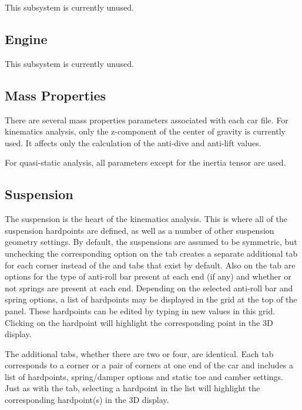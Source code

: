 This subsystem is currently unused.

\subsection{Engine} \label{ssec:engine}

This subsystem is currently unused.

\subsection{Mass Properties} \label{ssec:massProperties}

There are several mass properties parameters associated with each car file.  For kinematics analysis, only the z-component of the center of gravity is currently used.  It affects only the calculation of the anti-dive and anti-lift values.

For quasi-static analysis, all parameters except for the inertia tensor are used.

\subsection{Suspension} \label{ssec:suspension}

The suspension is the heart of the kinematics analysis.  This is where all of the suspension hardpoints are defined, as well as a number of other suspension geometry settings.  By default, the suspensions are assumed to be symmetric, but unchecking the corresponding option on the  tab creates a separate additional tab for each corner instead of the  and  tabs that exist by default.  Also on the  tab are options for the type of anti-roll bar present at each end (if any) and whether or not  springs are present at each end.  Depending on the selected anti-roll bar and  spring options, a list of hardpoints may be displayed in the grid at the top of the panel.  These hardpoints can be edited by typing in new values in this grid.  Clicking on the hardpoint will highlight the corresponding point in the 3D display.

The additional tabs, whether there are two or four, are identical.  Each tab corresponds to a corner or a pair of corners at one end of the car and includes a list of hardpoints, spring/damper options and static toe and camber settings.  Just as with the  tab, selecting a hardpoint in the list will highlight the corresponding hardpoint(s) in the 3D display.

